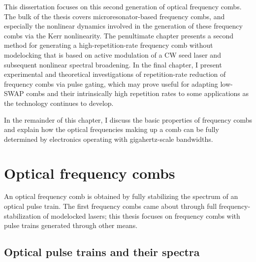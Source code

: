 This dissertation focuses on this second generation of optical frequency combs. The bulk of the thesis covers microresonator-based frequency combs, and especially the nonlinear dynamics involved in the generation of these frequency combs via the Kerr nonlinearity. The penultimate chapter presents a second method for generating a high-repetition-rate frequency comb without modelocking that is based on active modulation of a CW seed laser and subsequent nonlinear spectral broadening. In the final chapter, I present experimental and theoretical investigations of repetition-rate reduction of frequency combs via pulse gating, which may prove useful for adapting low-SWAP combs and their intrinsically high repetition rates to some applications as the technology continues to develop.

In the remainder of this chapter, I discuss the basic properties of frequency combs and explain how the optical frequencies making up a comb can be fully determined by electronics operating with gigahertz-scale bandwidths.

\section{Optical frequency combs}

An optical frequency comb is obtained by fully stabilizing the spectrum of an optical pulse train. The first frequency combs came about through full frequency-stabilization of modelocked lasers; this thesis focuses on frequency combs with pulse trains generated through other means.

\subsection{Optical pulse trains and their spectra}


